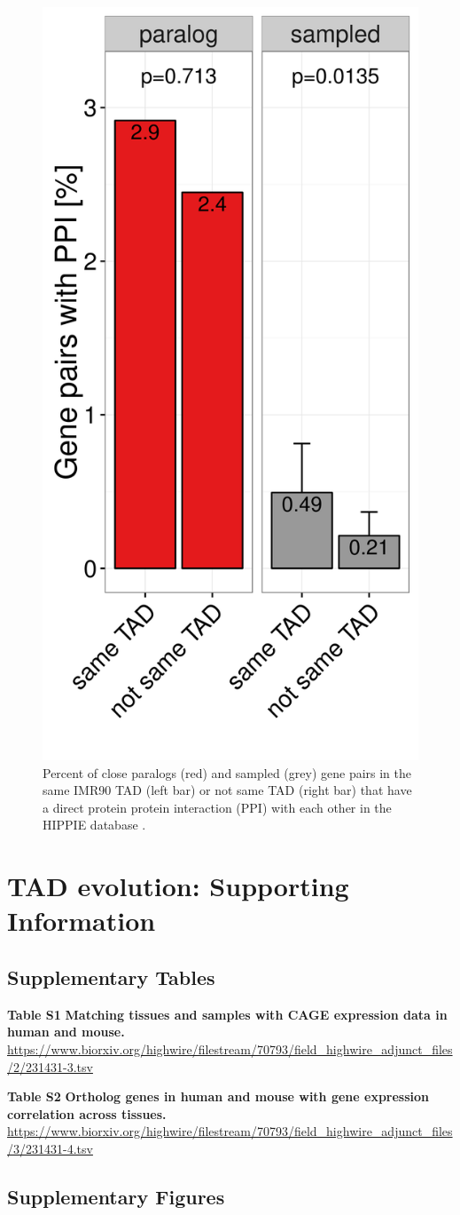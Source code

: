 \documentclass[a4paper,twoside=true,openright,parskip=full,chapterprefix=true,11pt,headings=normal,bibliography=totoc,listof=totoc,titlepage=on,captions=tableabove,draft=false]{scrreprt}
\theoremstyle{definition}
\theoremstyle{definition}
\theoremstyle{definition}
\theoremstyle{remark}
\begin{document}
\begin{figure}

{\centering \includegraphics[width=0.3\linewidth]{figures/paralog/SI/figS14} 

}

\caption{Percent of close paralogs (red) and sampled (grey) gene pairs
in the same IMR90 TAD (left bar) or not same TAD (right bar) that have a
direct protein protein interaction (PPI) with each other in the HIPPIE
database \citep{Schaefer2012}.}\label{fig:PPI}
\end{figure}






\hypertarget{sup-tad-evolution}{%
\chapter{TAD evolution: Supporting
Information}\label{sup-tad-evolution}}

\hypertarget{TadEvoSupTab}{%
\section{Supplementary Tables}\label{TadEvoSupTab}}

\textbf{Table S1} \textbf{Matching tissues and samples with CAGE
expression data in human and mouse.}
\url{https://www.biorxiv.org/highwire/filestream/70793/field_highwire_adjunct_files/2/231431-3.tsv}

\textbf{Table S2} \textbf{Ortholog genes in human and mouse with gene
expression correlation across tissues.}
\url{https://www.biorxiv.org/highwire/filestream/70793/field_highwire_adjunct_files/3/231431-4.tsv}

\hypertarget{supplementary-figures}{%
\section{Supplementary Figures}\label{supplementary-figures}}
\end{document}
